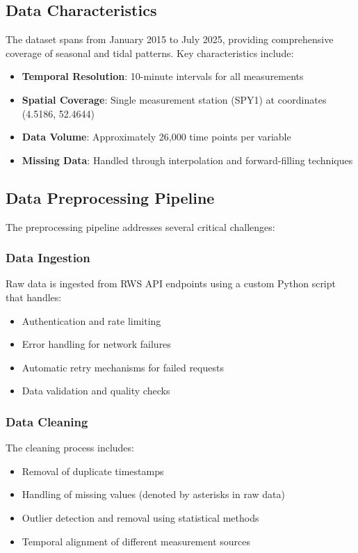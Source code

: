 \documentclass[12pt,a4paper]{article}
\begin{document}
\subsection{Data Characteristics}
The dataset spans from January 2015 to July 2025, providing comprehensive coverage of seasonal and tidal patterns. Key characteristics include:

\begin{itemize}
    \item \textbf{Temporal Resolution}: 10-minute intervals for all measurements
    \item \textbf{Spatial Coverage}: Single measurement station (SPY1) at coordinates (4.5186, 52.4644)
    \item \textbf{Data Volume}: Approximately 26,000 time points per variable
    \item \textbf{Missing Data}: Handled through interpolation and forward-filling techniques
\end{itemize}

\subsection{Data Preprocessing Pipeline}
The preprocessing pipeline addresses several critical challenges:

\subsubsection{Data Ingestion}
Raw data is ingested from RWS API endpoints using a custom Python script that handles:
\begin{itemize}
    \item Authentication and rate limiting
    \item Error handling for network failures
    \item Automatic retry mechanisms for failed requests
    \item Data validation and quality checks
\end{itemize}

\subsubsection{Data Cleaning}
The cleaning process includes:
\begin{itemize}
    \item Removal of duplicate timestamps
    \item Handling of missing values (denoted by asterisks in raw data)
    \item Outlier detection and removal using statistical methods
    \item Temporal alignment of different measurement sources
\end{itemize}
\end{document}
